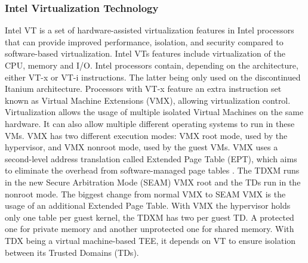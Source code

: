 \subsubsection{Intel Virtualization Technology}
Intel VT is a set of hardware-assisted virtualization features in Intel processors that can provide improved performance, isolation, and security compared to software-based virtualization. Intel VTs features include virtualization of the CPU, memory and I/O.
Intel processors contain, depending on the architecture, either VT-x or VT-i instructions. The latter being only used on the discontinued Itanium architecture. Processors with VT-x feature an extra instruction set known as Virtual Machine Extensions (VMX), allowing virtualization control. Virtualization allows the usage of multiple isolated Virtual Machines on the same hardware. It can also allow multiple different operating systems to run in these VMs\cite{noauthor_white_nodate}. VMX has two different execution modes: VMX root mode, used by the hypervisor, and VMX nonroot mode, used by the guest VMs. VMX uses a second-level address translation called Extended Page Table (EPT), which aims to eliminate the overhead from software-managed page tables \cite{uhlig_intel_2005}. The \Gls{TDXM} runs in the new Secure Arbitration Mode (SEAM) VMX root and the TDs run in the nonroot mode. The biggest change from normal VMX to SEAM VMX is the usage of an additional Extended Page Table. With VMX the hypervisor holds only one table per guest kernel, the TDXM has two per guest TD. A protected one for private memory and another unprotected one for shared memory.
With TDX being a virtual machine-based \Gls{TEE}, it depends on VT to ensure isolation between its Trusted Domains (TDs)\cite{cheng_intel_2023}.
